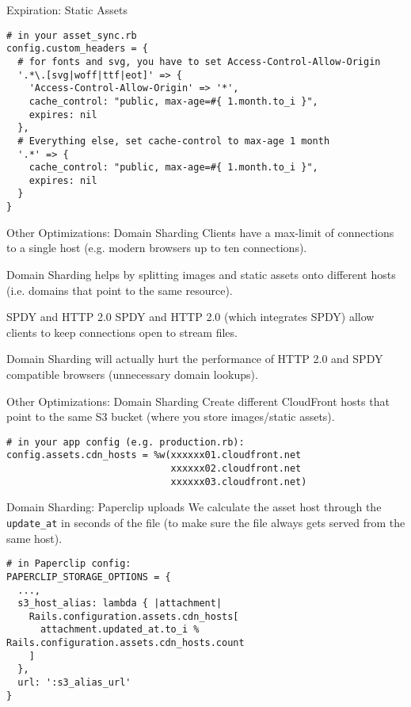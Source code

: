 \documentclass{beamer}
\begin{document}
\begin{frame}[fragile]{Expiration: Static Assets}
\begin{lstlisting}
# in your asset_sync.rb
config.custom_headers = {
  # for fonts and svg, you have to set Access-Control-Allow-Origin
  '.*\.[svg|woff|ttf|eot]' => {
    'Access-Control-Allow-Origin' => '*',
    cache_control: "public, max-age=#{ 1.month.to_i }",
    expires: nil
  },
  # Everything else, set cache-control to max-age 1 month
  '.*' => {
    cache_control: "public, max-age=#{ 1.month.to_i }",
    expires: nil
  }
}
\end{lstlisting}
\end{frame}

\begin{frame}{Other Optimizations: Domain Sharding}
Clients have a max-limit of connections to a single host (e.g. modern browsers up to ten connections).

Domain Sharding helps by splitting images and static assets onto different hosts (i.e. domains that point to the same resource).
\begin{block}{SPDY and HTTP 2.0}
SPDY and HTTP 2.0 (which integrates SPDY) allow clients to keep connections open to stream files.

Domain Sharding will actually hurt the performance of HTTP 2.0 and SPDY compatible browsers (unnecessary domain lookups).
\end{block}
\end{frame}

\begin{frame}[fragile]{Other Optimizations: Domain Sharding}
Create different CloudFront hosts that point to the same S3 bucket (where you store images/static assets).
\begin{lstlisting}
# in your app config (e.g. production.rb):
config.assets.cdn_hosts = %w(xxxxxx01.cloudfront.net
                             xxxxxx02.cloudfront.net
                             xxxxxx03.cloudfront.net)
\end{lstlisting}
\end{frame}

\begin{frame}[fragile]{Domain Sharding: Paperclip uploads}
We calculate the asset host through the \lstinline{update_at} in seconds of the file (to make sure the file always gets served from the same host).
\begin{lstlisting}
# in Paperclip config:
PAPERCLIP_STORAGE_OPTIONS = {
  ...,
  s3_host_alias: lambda { |attachment|
    Rails.configuration.assets.cdn_hosts[
      attachment.updated_at.to_i % Rails.configuration.assets.cdn_hosts.count
    ]
  },
  url: ':s3_alias_url'
}
\end{lstlisting}
\end{frame}
\end{document}
